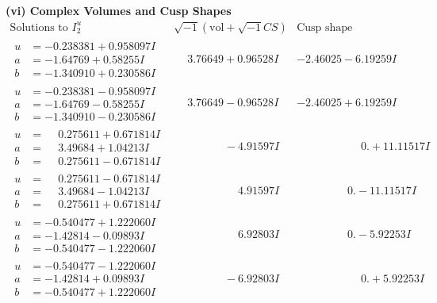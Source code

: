 \documentclass[1p]{elsarticle_modified}
\theoremstyle{definition}
\newcommand{\I}{\sqrt{-1}}
\begin{document}
\newpage\flushleft \textbf{(vi) Complex Volumes and Cusp Shapes}
$$\begin{array}{c|c|c}  
\text{Solutions to }I^u_{2}& \I (\text{vol} + \sqrt{-1}CS) & \text{Cusp shape}\\
 \hline 
\begin{aligned}
u &= -0.238381 + 0.958097 I \\
a &= -1.64769 + 0.58255 I \\
b &= -1.340910 + 0.230586 I\end{aligned}
 & \phantom{-}3.76649 + 0.96528 I & -2.46025 - 6.19259 I \\ \hline\begin{aligned}
u &= -0.238381 - 0.958097 I \\
a &= -1.64769 - 0.58255 I \\
b &= -1.340910 - 0.230586 I\end{aligned}
 & \phantom{-}3.76649 - 0.96528 I & -2.46025 + 6.19259 I \\ \hline\begin{aligned}
u &= \phantom{-}0.275611 + 0.671814 I \\
a &= \phantom{-}3.49684 + 1.04213 I \\
b &= \phantom{-}0.275611 - 0.671814 I\end{aligned}
 & \phantom{-0.000000 } -4.91597 I & \phantom{-0.000000 -}0. + 11.11517 I \\ \hline\begin{aligned}
u &= \phantom{-}0.275611 - 0.671814 I \\
a &= \phantom{-}3.49684 - 1.04213 I \\
b &= \phantom{-}0.275611 + 0.671814 I\end{aligned}
 & \phantom{-0.000000 -}4.91597 I & \phantom{-0.000000 } 0. - 11.11517 I \\ \hline\begin{aligned}
u &= -0.540477 + 1.222060 I \\
a &= -1.42814 - 0.09893 I \\
b &= -0.540477 - 1.222060 I\end{aligned}
 & \phantom{-0.000000 -}6.92803 I & \phantom{-0.000000 } 0. - 5.92253 I \\ \hline\begin{aligned}
u &= -0.540477 - 1.222060 I \\
a &= -1.42814 + 0.09893 I \\
b &= -0.540477 + 1.222060 I\end{aligned}
 & \phantom{-0.000000 } -6.92803 I & \phantom{-0.000000 -}0. + 5.92253 I \\ \hline\begin{aligned}

\end{aligned}
\end{array}$$
\end{document}
